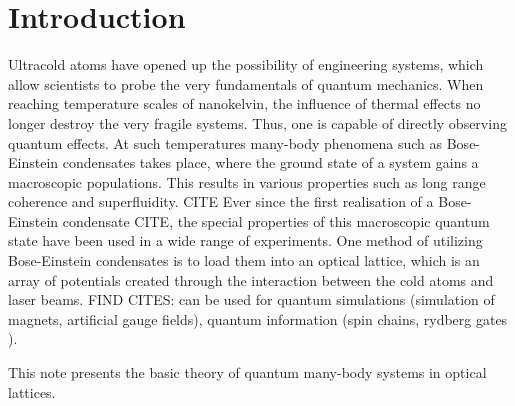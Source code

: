 \chapter{Introduction}

Ultracold atoms have opened up the possibility of engineering systems, which allow scientists to probe the very fundamentals of quantum mechanics. When reaching temperature scales of nanokelvin, the influence of thermal effects no longer destroy the very fragile systems. Thus, one is capable of directly observing quantum effects. At such temperatures many-body phenomena such as Bose-Einstein condensates takes place, where the ground state of a system gains a macroscopic populations. This results in various properties such as long range coherence and superfluidity. CITE
Ever since the first realisation of a Bose-Einstein condensate CITE, the special properties of this macroscopic quantum state have been used in a wide range of experiments. One method of utilizing Bose-Einstein condensates is to load them into an optical lattice, which is an array of potentials created through the interaction between the cold atoms and laser beams. FIND CITES: can be used for quantum simulations (simulation of magnets, artificial gauge fields), quantum information (spin chains, rydberg gates ).

This note presents the basic theory of quantum many-body systems in optical lattices.
\newpage